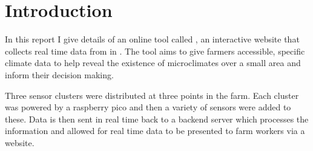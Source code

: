 \section{Introduction}

In this report I give details of an online tool called \myReportTitle{}, an
interactive website that collects real time data from \farmName{} in
\farmLocation{}. The tool aims to give farmers accessible, specific climate data
to help reveal the existence of microclimates over a small area and inform their
decision making.

Three sensor clusters were distributed at three points in the farm. Each
cluster was powered by a raspberry pico and then a variety of sensors
were added to these. Data is then sent in real time back to a backend server
which processes the information and allowed for real time data to be presented
to farm workers via a website.
